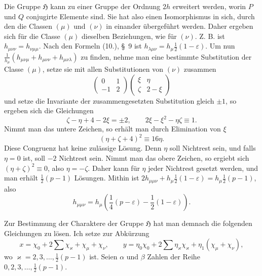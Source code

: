 \documentclass[11pt]{article}
\newcommand{\grp}{\mathfrak{H}}
\begin{document}
Die Gruppe $\grp$ kann zu einer Gruppe der Ordnung $2h$ erweitert werden, worin $P$ und $Q$ conjugirte Elemente sind. Sie hat also einen Isomorphismus in sich, durch den die Classen $(\mu)$ und $(\nu)$ in einander übergeführt werden. Daher ergeben sich für die Classe $(\mu)$ dieselben Beziehungen, wie für $(\nu)$. Z. B. ist $h_{\mu\nu\nu}=h_{\nu\mu\mu}$. Nach den Formeln (10.), \S~9 ist $h_{\lambda\mu\nu}=h_\mu\frac12(1-\varepsilon)$. Um nun $\frac{1}{h_\mu}(h_{\mu\nu\mu}+h_{\mu\nu\nu}+h_{\mu\nu\lambda})$ zu finden, nehme man eine bestimmte Substitution der Classe $(\mu)$, setze sie mit allen Substitutionen von $(\nu)$ zusammen
\[
\begin{pmatrix}0&1\\-1&2\end{pmatrix}
\begin{pmatrix}\xi&\eta\\ \zeta&2-\xi\end{pmatrix}
\]
und setze die Invariante der zusammengesetzten Substitution gleich $\pm1$, so ergeben sich die Gleichungen
\[
\zeta-\eta+4-2\xi=\pm2,\qquad
2\xi-\xi^2-\eta\zeta\equiv1.
\]
Nimmt man das untere Zeichen, so erhält man durch Elimination von $\xi$
\[
(\eta+\zeta+4)^2\equiv16\eta.
\]
Diese Congruenz hat keine zulässige Lösung. Denn $\eta$ soll Nichtrest sein, und falls $\eta=0$ ist, soll $-2$ Nichtrest sein. Nimmt man das obere Zeichen, so ergiebt sich $(\eta+\zeta)^2\equiv0$, also $\eta=-\zeta$. Daher kann für $\eta$ jeder Nichtrest gesetzt werden, und man erhält $\frac12(p-1)$ Lösungen. Mithin ist $2h_{\mu\mu\nu}+h_\mu\frac12(1-\varepsilon)=h_\mu\frac12(p-1)$, also
\[
h_{\mu\mu\nu}=h_\mu\left(\frac14(p-\varepsilon)-\frac12(1-\varepsilon)\right).
\]

Zur Bestimmung der Charaktere der Gruppe $\grp$ hat man demnach die folgenden Gleichungen zu lösen. Ich setze zur Abkürzung
\[
x=\chi_0+2\sum\chi_\varkappa+\chi_\mu+\chi_\nu,\qquad
y=\eta_0\chi_0+2\sum\eta_\varkappa\chi_\varkappa+\eta_1(\chi_\mu+\chi_\nu),
\]
wo $\varkappa=2,3,\ldots,\frac12(p-1)$ ist. Seien $\alpha$ und $\beta$ Zahlen der Reihe $0,2,3,\ldots,\frac12(p-1)$.
\end{document}
